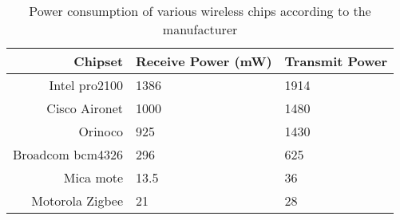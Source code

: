 \begin{table*}
\begin{tabular}{|r|l|l|}
\hline
Chipset & Receive Power (mW) & Transmit Power\\
\hline
\hline
Intel pro2100 & 1386 & 1914\\
\hline
Cisco Aironet & 1000 & 1480\\
\hline
Orinoco & 925 & 1430\\
\hline
Broadcom bcm4326 & 296 & 625\\
\hline
Mica mote & 13.5 & 36 \\
\hline
Motorola Zigbee & 21 & 28\\
\hline
\end{tabular}

\caption{Power consumption of various wireless chips according to the manufacturer}
\end{table*}
